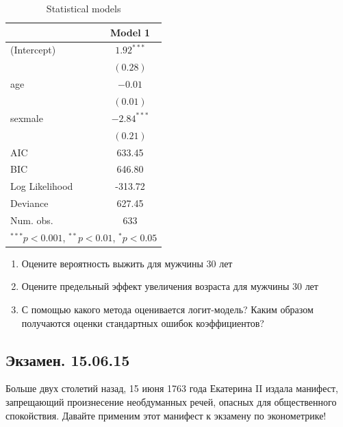 \documentclass[12pt, a4paper]{article}\usepackage[]{graphicx}\usepackage[]{color}
\begin{document}
\begin{enumerate}
\begin{table}[h!]
\begin{center}
\begin{tabular}{l c }
\hline
 & Model 1 \\
\hline
(Intercept)    & $1.92^{***}$  \\
               & $(0.28)$      \\
age            & $-0.01$       \\
               & $(0.01)$      \\
sexmale        & $-2.84^{***}$ \\
               & $(0.21)$      \\
\hline
AIC            & 633.45        \\
BIC            & 646.80        \\
Log Likelihood & -313.72       \\
Deviance       & 627.45        \\
Num. obs.      & 633           \\
\hline
\multicolumn{2}{l}{\scriptsize{$^{***}p<0.001$, $^{**}p<0.01$, $^*p<0.05$}}
\end{tabular}
\caption{Statistical models}
\label{table:coefficients}
\end{center}
\end{table}


\begin{enumerate}
\item Оцените вероятность выжить для мужчины 30 лет
\item Оцените предельный эффект увеличения возраста для мужчины 30 лет
\item С помощью какого метода оценивается логит-модель? Каким образом получаются оценки стандартных ошибок коэффициентов?
\end{enumerate}


\end{enumerate}


\subsection{Экзамен. 15.06.15}


Больше двух столетий назад, 15 июня 1763 года Екатерина II издала манифест, запрещающий произнесение необдуманных речей, опасных для общественного спокойствия. Давайте применим этот манифест к экзамену по эконометрике!
\end{document}
